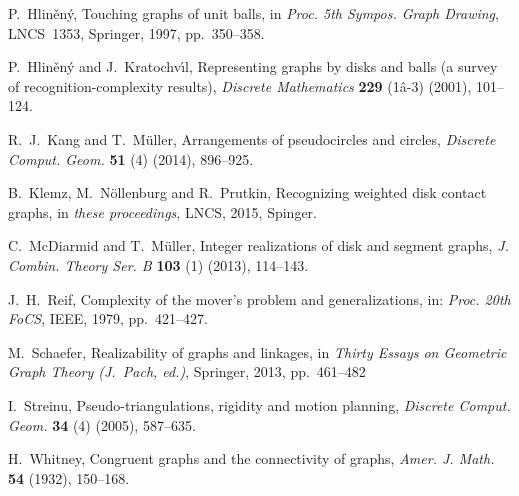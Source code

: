 \documentclass[runningheads]{article}
\begin{document}
\begin{thebibliography}{99}
P.~Hlin\v{e}n\'y,
Touching graphs of unit balls,
in \emph{Proc. 5th Sympos. Graph Drawing}, LNCS~1353, Springer, 1997, pp.~350--358.

P.~Hlin\v{e}n\'y and J.~Kratochv\'{\i}l,
Representing graphs by disks and balls (a survey of recognition-complexity results),
\emph{Discrete Mathematics} {\bf 229} (1â-3) (2001), 101--124.

R.~J.~Kang and T.~M\"uller,
Arrangements of pseudocircles and circles,
\emph{Discrete Comput. Geom.} {\bf 51} (4) (2014), 896--925.

B.~Klemz, M.~N\"ollenburg and R.~Prutkin,
Recognizing weighted disk contact graphs,
in \emph{these proceedings}, LNCS, 2015, Spinger.

C.~McDiarmid and T.~M\"uller,
Integer realizations of disk and segment graphs,
\emph{J. Combin. Theory Ser. B} {\bf 103} (1) (2013), 114--143.





 J.~H.~Reif,
Complexity of the mover's problem and generalizations,
in: \emph{Proc. 20th FoCS}, IEEE, 1979, pp.~421--427.

M.~Schaefer, Realizability of graphs and linkages,
in \emph{Thirty Essays on Geometric Graph Theory (J.~Pach, ed.)},
Springer, 2013, pp.~461--482

I.~Streinu,
Pseudo-triangulations, rigidity and motion planning,
\emph{Discrete Comput. Geom.} {\bf 34} (4) (2005), 587--635.

H.~Whitney,
Congruent graphs and the connectivity of graphs,
\emph{Amer. J. Math.} {\bf 54} (1932), 150--168.

\end{thebibliography}
\end{document}
